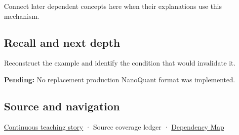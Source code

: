 Connect later dependent concepts here when their explanations use this mechanism.

\subsection{Recall and next depth}\label{appendix-590bbb2424c1-recall-and-next-depth}

Reconstruct the example and identify the condition that would invalidate it.

\textbf{Pending:} No replacement production NanoQuant format was implemented.

\subsection{Source and navigation}\label{appendix-590bbb2424c1-source-and-navigation}

\hyperref[01-foundations-i-ch002-bytes-become-a-durable-agreement]{Continuous teaching story} · {Source coverage ledger} · \hyperref[appendix-4ad47bdd269a]{Dependency Map}
